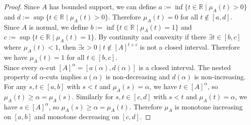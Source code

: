 \begin{proof}
 Since $A$ has bounded support, we can define $a:=\inf\{t\in\mathbb{R} \mid \mu_A(t)>0\}$ and $d:=\sup\{t\in\mathbb{R} \mid \mu_A(t)>0\}$. Therefore $\mu_A(t)=0$ for all $t\notin[a,d]$. \\

 Since $A$ is normal, we define $b:=\inf\{t\in\mathbb{R} \mid \mu_A(t)=1\}$ and $c:=\sup\{t\in\mathbb{R} \mid \mu_A(t)=1\}$. By continuity and convexity if there $\exists t\in [b,c]$ where $\mu_A(t)<1$, then $\exists \epsilon >0 \mid t\notin [A]^{t+\epsilon}$ is not a closed interval. Therefore we have $\mu_A(t)=1$ for all $t\in[b,c]$. \\

 Since every $\alpha$-cut $[A]^\alpha=[a(\alpha),d(\alpha)]$ is a closed interval. The nested property of $\alpha$-cuts implies $a(\alpha)$ is non-decreasing and $d(\alpha)$ is non-increasing. For any $s,t\in[a,b]$ with $s<t$ and $\mu_A(s)=\alpha$, we have $t\in[A]^\alpha$, so $\mu_A(t)\geq\alpha=\mu_A(s)$. Similarly for $s,t\in[c,d]$ with $s<t$ and $\mu_A(t)=\alpha$, we have $s\in[A]^\alpha$, so $\mu_A(s)\geq\alpha=\mu_A(t)$. Therefore $\mu_A$ is monotone increasing on $[a,b]$ and monotone decreasing on $[c,d]$.
\end{proof}


